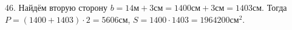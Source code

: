 46. Найдём вторую сторону $b=14\text{м}+3\text{см}=1400\text{см}+3\text{см}=1403\text{см}.$ Тогда $P=(1400+1403)\cdot2=5606$см, $S=1400\cdot1403=1964200\text{см}^2.$\\
